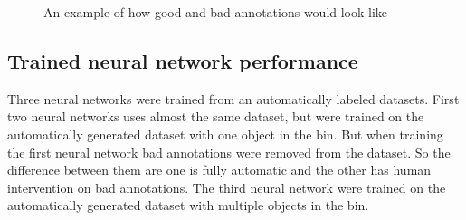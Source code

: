 \begin{figure}[h]
    \centering
    \hfill
    \caption{An example of how good and bad annotations would look like}
    \label{figure: goodandbad}
\end{figure}
\vspace{1cm}

\subsection{Trained neural network performance}


Three neural networks were trained from an automatically labeled datasets. 
First two neural networks uses almost the same dataset, but were trained on the automatically generated dataset with one object in the bin. But when training the first neural network bad annotations were removed from the dataset. 
So the difference between them are one is fully automatic and the other has human intervention on bad annotations.
The third neural network were trained on the automatically generated dataset with multiple objects in the bin.

